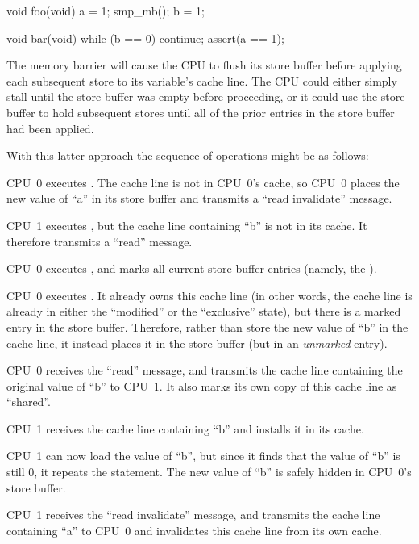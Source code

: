 \begin{VerbatimN}[fontsize=\footnotesize,samepage=true]
void foo(void)
{
	a = 1;
	smp_mb();
	b = 1;
}

void bar(void)
{
	while (b == 0) continue;
	assert(a == 1);
}
\end{VerbatimN}

The memory barrier  will cause the CPU to flush its store
buffer before applying each subsequent store to its variable's cache line.
The CPU could either simply stall until the store buffer was empty
before proceeding, or it could use the store buffer to hold subsequent
stores until all of the prior entries in the store buffer had been
applied.

With this latter approach the sequence of operations might be as follows:
\begin{sequence}
\item	CPU~0 executes .  The cache line is not in
	CPU~0's cache, so CPU~0 places the new value of ``a'' in its
	store buffer and transmits a ``read invalidate'' message.
\item	CPU~1 executes , but the cache line
	containing ``b'' is not in its cache.
	It therefore transmits a ``read'' message.
\item	CPU~0 executes , and marks all current store-buffer
	entries (namely, the ).
\item	CPU~0 executes .
	It already owns this cache line (in other words, the cache line
	is already in either the ``modified'' or the ``exclusive'' state),
	but there is a marked entry in the store buffer.
	Therefore, rather than store the new value of ``b'' in the
	cache line, it instead places it in the store buffer (but
	in an \emph{unmarked} entry).
\item	CPU~0 receives the ``read'' message, and transmits the
	cache line containing the original value of ``b''
	to CPU~1.
	It also marks its own copy of this cache line as ``shared''.
\item	CPU~1 receives the cache line containing ``b'' and installs
	it in its cache.
\item	CPU~1 can now load the value of ``b'',
	but since it finds that the value of ``b'' is still 0, it repeats
	the  statement.
	The new value of ``b'' is safely hidden in CPU~0's store buffer.
\item	CPU~1 receives the ``read invalidate'' message, and
	transmits the cache line containing ``a'' to CPU~0 and
	invalidates this cache line from its own cache.

\end{sequence}

